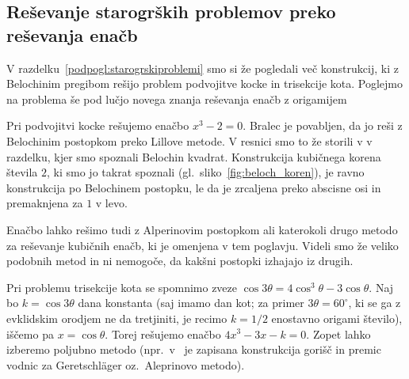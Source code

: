 \subsection{Reševanje starogrških problemov preko reševanja enačb}

V razdelku~\ref{podpogl:starogrskiproblemi} smo si že pogledali več konstrukcij, ki z Belochinim pregibom rešijo problem podvojitve kocke in trisekcije kota. Poglejmo na problema še pod lučjo novega znanja reševanja enačb z origamijem

Pri podvojitvi kocke rešujemo enačbo $x^3 - 2 = 0$. Bralec je povabljen, da jo reši z Belochinim postopkom preko Lillove metode. V resnici smo to že storili v v razdelku, kjer smo spoznali Belochin kvadrat. Konstrukcija kubičnega korena števila $2$, ki smo jo takrat spoznali (gl.\ sliko~\ref{fig:beloch_koren}), je ravno konstrukcija po Belochinem postopku, le da je zrcaljena preko abscisne osi in premaknjena za $1$ v levo.

Enačbo lahko rešimo tudi z Alperinovim postopkom ali katerokoli drugo metodo za reševanje kubičnih enačb, ki je omenjena v tem poglavju. Videli smo že veliko podobnih metod in ni nemogoče, da kakšni postopki izhajajo iz drugih.

Pri problemu trisekcije kota se spomnimo zveze $\cos 3\theta = 4 \cos^3 \theta - 3 \cos \theta$. Naj bo $k = \cos 3\theta$ dana konstanta (saj imamo dan kot; za primer $3 \theta = 60^\circ$, ki se ga z evklidskim orodjem ne da tretjiniti, je recimo $k = 1/2$ enostavno origami število), iščemo pa $x = \cos \theta$. Torej rešujemo enačbo $4x^3-3x-k=0$. Zopet lahko izberemo poljubno metodo (npr.\ v~\cite[str.\ 370]{geret1995} je zapisana konstrukcija gorišč in premic vodnic za Geretschläger oz.\ Aleprinovo metodo).
